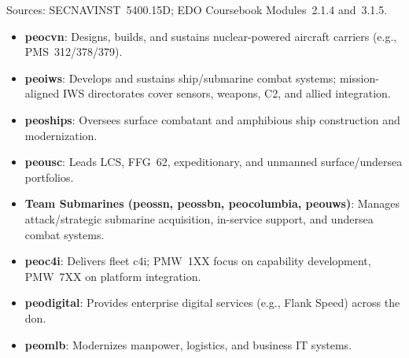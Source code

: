 \documentclass[../main.tex]{subfiles}
\begin{document}
\begin{description}[style=nextline, labelsep=0.5em, font=\bfseries]
	\item[\textbf{Program Executive Offices (Navy portfolios).}]
	Sources: SECNAVINST~5400.15D; EDO Coursebook Modules~2.1.4 and~3.1.5.
      \begin{itemize}
        \item \textbf{\ac{peocvn}}: Designs, builds, and sustains nuclear-powered aircraft carriers (e.g., PMS~312/378/379).
        \item \textbf{\ac{peoiws}}: Develops and sustains ship/submarine combat systems; mission-aligned IWS directorates cover sensors, weapons, C2, and allied integration.
        \item \textbf{\ac{peoships}}: Oversees surface combatant and amphibious ship construction and modernization.
        \item \textbf{\ac{peousc}}: Leads LCS, FFG~62, expeditionary, and unmanned surface/undersea portfolios.
        \item \textbf{Team Submarines (\ac{peossn}, \ac{peossbn}, \ac{peocolumbia}, \ac{peouws})}: Manages attack/strategic submarine acquisition, in-service support, and undersea combat systems.
        \item \textbf{\ac{peoc4i}}: Delivers fleet \ac{c4i}; PMW~1XX focus on capability development, PMW~7XX on platform integration.
        \item \textbf{\ac{peodigital}}: Provides enterprise digital services (e.g., Flank Speed) across the \ac{don}.
        \item \textbf{\ac{peomlb}}: Modernizes manpower, logistics, and business IT systems.
      \end{itemize}


\end{description}
\end{document}
